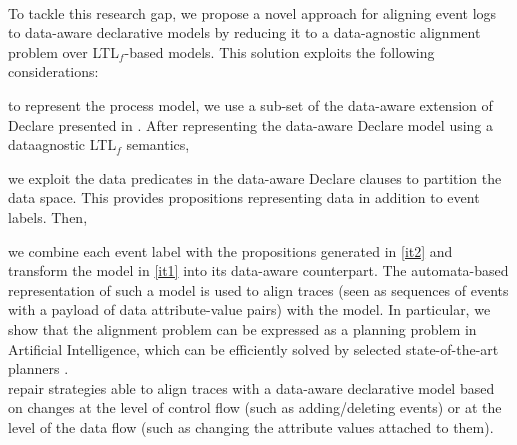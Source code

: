 \\
\indent
To tackle this research gap, we propose a novel approach for aligning event logs to data-aware declarative models by reducing it to a data-agnostic alignment problem over LTL$_f$-based models. This solution exploits the following considerations: \begin{enumerate*}[label=\emph{\alph*})]
	\item \label{it1} to represent the process model, we use a sub-set of the data-aware extension of Declare presented in \cite{BurattinMS16}. After representing the data-aware Declare model using a data\added{-}agnostic LTL$_f$ semantics,
	\item \label{it2} we exploit the data predicates in the data-aware Declare clauses to partition the data space. This provides propositions representing data in addition to event labels. Then,
	\item we combine each event label with the propositions generated in \ref{it2} and transform the model in \ref{it1} into its data-aware counterpart. The automata-based representation of such a model is used to align traces (seen as sequences of events with a payload of data attribute-value pairs) with the model.
In particular, we show that the alignment problem can be expressed as a planning problem in Artificial Intelligence, which can be efficiently solved by selected state-of-the-art planners \cite{XuLZ17a,Marrella17}.
%
\\
\indent
{}
%
%
 repair strategies able to align traces with a data-aware declarative model based on changes at the level of control flow (such as adding/deleting events) or at the level of the data flow (such as changing the attribute values attached to them).
\end{enumerate*}

